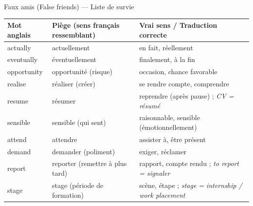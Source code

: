\documentclass[11pt]{article}
\newcommand{\cle}[1]{{\popxbold\color{popdark}#1}}
\newcommand{\eng}[1]{\ifmmode\text{\textit{#1}}\else\begingroup\selectlanguage{english}\itshape #1\endgroup\fi}
\begin{document}
\begin{attention}{Faux amis (False friends) — Liste de survie}
\begin{center}
\begin{tabularx}{\linewidth}{|X|X|X|}
\hline
\rowcolor{popblueL}
\textbf{Mot anglais} & \textbf{Piège (sens français ressemblant)} & \textbf{Vrai sens / Traduction correcte} \\
\hline
\cle{actually} & actuellement & en fait, réellement \\
\hline
\cle{eventually} & éventuellement & finalement, à la fin \\
\hline
\cle{opportunity} & opportunité (risque) & occasion, chance favorable \\
\hline
\cle{realise} & réaliser (créer) & se rendre compte, comprendre \\
\hline
\cle{resume} & résumer & reprendre (après pause) ; \eng{CV} = \eng{résumé} \\
\hline
\cle{sensible} & sensible (qui sent) & raisonnable, sensible (émotionnellement) \\
\hline
\cle{attend} & attendre & assister à, être présent \\
\hline
\cle{demand} & demander (poliment) & exiger, réclamer \\
\hline
\cle{report} & reporter (remettre à plus tard) & rapport, compte rendu ; \eng{to report} = signaler \\
\hline
\cle{stage} & stage (période de formation) & scène, étape ; \eng{stage} = \eng{internship} / \eng{work placement} \\
\hline
\end{tabularx}
\end{center}
\end{attention}
\end{document}
